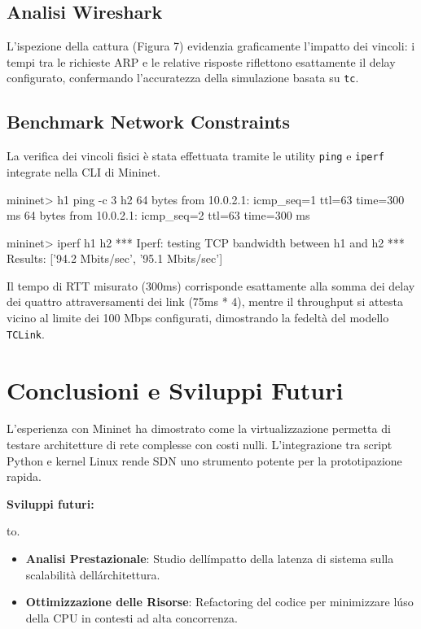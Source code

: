 \documentclass[a4paper,12pt]{article}
\begin{document}
\subsection{Analisi Wireshark}
L'ispezione della cattura (Figura 7) evidenzia graficamente l'impatto dei vincoli: i tempi tra le richieste ARP e le relative risposte riflettono esattamente il delay configurato, confermando l'accuratezza della simulazione basata su \texttt{tc}.

\subsection{Benchmark Network Constraints}
La verifica dei vincoli fisici è stata effettuata tramite le utility \texttt{ping} e \texttt{iperf} integrate nella CLI di Mininet.
\begin{terminal}
mininet> h1 ping -c 3 h2
64 bytes from 10.0.2.1: icmp_seq=1 ttl=63 time=300 ms
64 bytes from 10.0.2.1: icmp_seq=2 ttl=63 time=300 ms

mininet> iperf h1 h2
*** Iperf: testing TCP bandwidth between h1 and h2 
*** Results: ['94.2 Mbits/sec', '95.1 Mbits/sec']
\end{terminal}
Il tempo di RTT misurato (300ms) corrisponde esattamente alla somma dei delay dei quattro attraversamenti dei link (75ms * 4), mentre il throughput si attesta vicino al limite dei 100 Mbps configurati, dimostrando la fedeltà del modello \texttt{TCLink}.

\section{Conclusioni e Sviluppi Futuri}
L'esperienza con Mininet ha dimostrato come la virtualizzazione permetta di testare architetture di rete complesse con costi nulli. L'integrazione tra script Python e kernel Linux rende SDN uno strumento potente per la prototipazione rapida.

\noindent \textbf{Sviluppi futuri:}

to.


\begin{itemize}
    \item \textbf{Analisi Prestazionale}: Studio dell\'impatto della latenza di sistema sulla scalabilità dell\'architettura.
    \item \textbf{Ottimizzazione delle Risorse}: Refactoring del codice per minimizzare l\'uso della CPU in contesti ad alta concorrenza.
\end{itemize}
\end{document}
